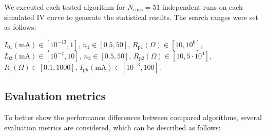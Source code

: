 \documentclass[a4paper,fleqn]{cas-sc}
\begin{document}
We executed each tested algorithm for $N_\mathrm{runs}=51$ independent runs on each simulated IV curve
to generate the statistical results.
The search ranges were set as follows:

\noindent
$I_{01}(\mathrm{mA})\in[10^{-13},1]$,
$n_1\in[0.5,50]$,
$R_\mathrm{p1}(\Omega)\in[10,10^6]$,
$I_{02}(\mathrm{mA})\in[10^{-7},10]$,
$n_2\in[0.5,50]$,
$R_\mathrm{p2}(\Omega)\in[10,5\cdot10^4]$,
$R_\mathrm{s}(\Omega)\in[0.1,1000]$,
$I_\mathrm{ph}(\mathrm{mA})\in[10^{-3},100]$.


\subsection{Evaluation metrics}\label{EvalCr}

To better show the performance differences between compared algorithms,
several evaluation metrics are considered, which can be described as follows:
\end{document}
